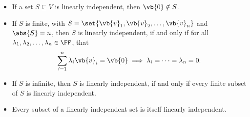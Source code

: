 \begin{remarks}
    \begin{itemize}
        \item If a set \(S \subseteq V\) is linearly independent, then \(\vb{0} \notin S\).
        \item If \(S\) is finite, with \(S = \set{\vb{v}_1, \vb{v}_2, \ldots, \vb{v}_n}\) and \(\abs{S} = n\), then \(S\) is linearly independent, if and only if for all \(\lambda_1, \lambda_2, \ldots, \lambda_n \in \FF\), that
        \[
            \sum_{i = 1}^{n} \lambda_i \vb{v}_i = \vb{0} \implies \lambda_i = \cdots = \lambda_n = 0.
        \]
        \item If \(S\) is infinite, then \(S\) is linearly independent, if and only if every finite subset of \(S\) is linearly independent.
        \item Every subset of a linearly independent set is itself linearly independent.
    \end{itemize}
\end{remarks}

